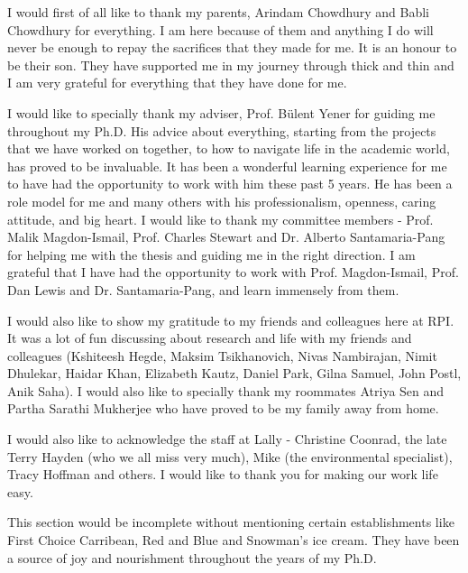 
I would first of all like to thank my parents, Arindam Chowdhury and Babli Chowdhury for everything. I am here because of them and anything I do will never be enough to repay the sacrifices that they made for me. It is an honour to be their son. They have supported me in my journey through thick and thin and I am very grateful for everything that they have done for me.

I would like to specially  thank my adviser, Prof. B{\"u}lent Yener for guiding me throughout my Ph.D. His advice about everything, starting from the projects that we have worked on together, to how to navigate life in the academic world, has proved to be invaluable. It has been
a wonderful learning experience for me to have had the opportunity to work with
him these past 5 years. He has been a role model for me and many others with his professionalism, openness, caring attitude, and big heart. 
I would  like to thank my committee members - Prof. Malik Magdon-Ismail, Prof. Charles Stewart and Dr. Alberto Santamaria-Pang for helping me with the thesis and guiding me in the right direction.  I am grateful that I have had the opportunity to work with  Prof.  Magdon-Ismail, Prof. Dan Lewis and Dr. Santamaria-Pang, and learn immensely from them.


I would also like to show my gratitude to my friends and colleagues here at RPI. It was a lot of fun discussing about research and life with my friends and colleagues (Kshiteesh Hegde, Maksim Tsikhanovich, Nivas Nambirajan, Nimit Dhulekar, Haidar Khan, Elizabeth Kautz, Daniel Park, Gilna Samuel, John Postl, Anik Saha).
I would also like to specially thank my roommates Atriya Sen and Partha Sarathi Mukherjee who have proved to be my family away from home.


I would also like to acknowledge the staff at Lally - Christine Coonrad, the late Terry Hayden (who we all miss very much), Mike (the environmental specialist), Tracy Hoffman and others. I would like to thank you for making our work life easy. 

This section would be incomplete without mentioning certain establishments like First Choice Carribean, Red and Blue and Snowman's ice cream. They have been a source of joy and nourishment throughout the years of my Ph.D.